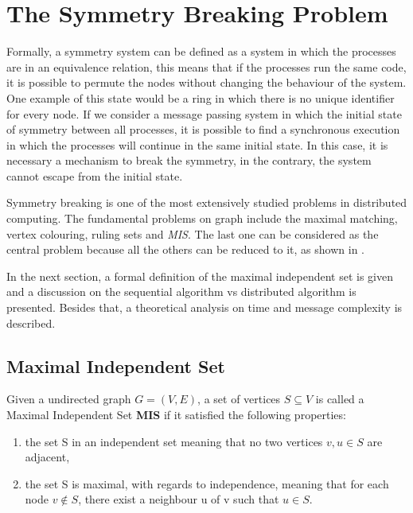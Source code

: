 \section{The Symmetry Breaking Problem}
\label{cap:2}

Formally, a symmetry system can be defined as a system in which the processes are in an equivalence relation, this means that if the processes run the same code, it is possible to permute the nodes without changing the behaviour of the system. One example of this state would be a ring in which there is no unique identifier for every node. If we consider a message passing system in which the initial state of symmetry between all processes, it is possible to find a synchronous execution in which the processes will continue in the same initial state. In this case, it is necessary a mechanism to break the symmetry, in the contrary, the system cannot escape from the initial state.

Symmetry breaking is one of the most extensively studied problems in distributed computing. The fundamental problems on graph include the maximal matching, vertex colouring, ruling sets and \textit{MIS}. The last one can be considered as the central problem because all the others can be reduced to it, as shown in  \cite{}.

In the next section, a formal definition of the maximal independent set is given and a discussion on the sequential algorithm vs distributed algorithm is presented. Besides that, a theoretical analysis on time and message complexity is described.     

\subsection{Maximal Independent Set}

\theoremstyle{definition}
\begin{definition}

Given a undirected graph $G = (V,E)$, a set of vertices $S \subseteq V$ is called a Maximal Independent Set \textbf{MIS} if it satisfied the following properties:   

\begin{enumerate}
  \item the set S in an independent set meaning that no two vertices $v,u \in S$ are adjacent,
  \item the set S is maximal, with regards to independence, meaning that for each node $v \notin S$, there 
    exist a neighbour u of v such that $u \in S$.
\end{enumerate}

\end{definition}

